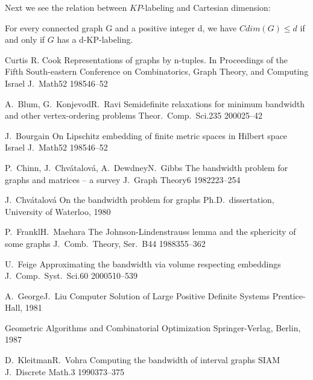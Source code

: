 \documentclass[12pt,a4paper,titlepage,openany]{report}
\begin{document}
Next we see the relation between $KP$-labeling and Cartesian dimension:
 \begin{theorem}
For every connected graph G and a positive integer d, we have $Cdim(G) \leq d$ if and only if $G$ has a d-KP-labeling.
\end{theorem}

 \begin{thebibliography}{99}
\thispagestyle{fancy}

\articleInJournalOneAuthor
    {Curtis R. Cook}
    {Representations of graphs by n-tuples. In Proceedings of the Fifth South-eastern Conference on Combinatorics, Graph Theory, and Computing}
   {Israel J.~Math}{52}
   {1985}{46--52}

  \articleInJournalManyAuthors
    {A.~Blum, G.~Konjevod}{R.~Ravi}
    {Semidefinite relaxations for minimum bandwidth and other vertex-ordering problems}
   {Theor.~Comp.~Sci.}{235}
   {2000}{25--42}

\articleInJournalOneAuthor
    {J.~Bourgain}
    {On Lipschitz embedding of finite metric spaces in Hilbert space}
   {Israel J.~Math}{52}
   {1985}{46--52}

  \articleInJournalManyAuthors
    {P.~Chinn, J.~Chv\'atalov\'a, A.~Dewdney}{N.~Gibbs}
    {The bandwidth problem for graphs and matrices -- a survey}
   {J.~Graph Theory}{6}
   {1982}{223--254}

\PhDDissertation
    {J.~Chv\'atalov\'a}
    {On the bandwidth problem for graphs}
    {Ph.D.~dissertation, University of Waterloo, 1980}

  \articleInJournalTwoAuthors
    {P.~Frankl}{H.~Maehara}
    {The Johnson-Lindenstrauss lemma and the sphericity of some graphs}
   {J.~Comb.~Theory, Ser.~B}{44}
   {1988}{355--362}

  \articleInJournalOneAuthor
    {U.~Feige}
    {Approximating the bandwidth via volume respecting embeddings}
    {J.~Comp.~Syst.~Sci.}{60}
    {2000}{510--539}

  \bookTwoAuthors
  {A.~George}{J.~Liu}
   {Computer Solution of Large Positive Definite Systems}
    {Prentice-Hall, 1981}

   {Geometric Algorithms and Combinatorial Optimization}
    {Springer-Verlag, Berlin, 1987}

   \articleInJournalTwoAuthors
     {D.~Kleitman}{R.~Vohra}
     {Computing the bandwidth of interval graphs}
     {SIAM J.~Discrete Math.}{3}
     {1990}{373--375}


\end{thebibliography}
\end{document}
